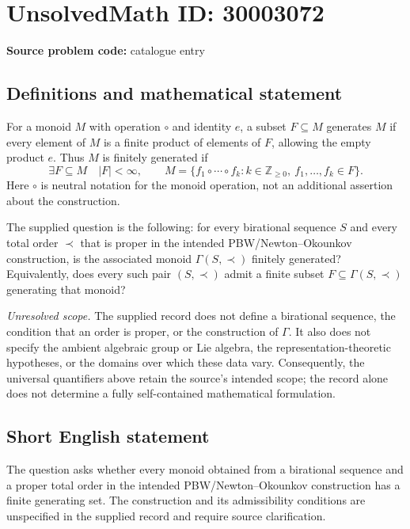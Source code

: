 \documentclass[11pt]{article}
\newcommand{\Z}{\mathbb{Z}}
\begin{document}
\section*{UnsolvedMath ID: 30003072}
\textbf{Source problem code:} catalogue entry
\subsection{Definitions and mathematical statement}
For a monoid \(M\) with operation \(\circ\) and identity \(e\), a subset \(F\subseteq M\) generates \(M\) if every element of \(M\) is a finite product of elements of \(F\), allowing the empty product \(e\). Thus \(M\) is finitely generated if
\[
\exists F\subseteq M\quad |F|<\infty,\qquad
M=\bigl\{f_1\circ\cdots\circ f_k : k\in\Z_{\geq 0},\ f_1,\ldots,f_k\in F\bigr\}.
\]
Here \(\circ\) is neutral notation for the monoid operation, not an additional assertion about the construction.

The supplied question is the following: for every birational sequence \(S\) and every total order \(\prec\) that is proper in the intended PBW/Newton--Okounkov construction, is the associated monoid \(\Gamma(S,\prec)\) finitely generated? Equivalently, does every such pair \((S,\prec)\) admit a finite subset \(F\subseteq\Gamma(S,\prec)\) generating that monoid?

\emph{Unresolved scope.} The supplied record does not define a birational sequence, the condition that an order is proper, or the construction of \(\Gamma\). It also does not specify the ambient algebraic group or Lie algebra, the representation-theoretic hypotheses, or the domains over which these data vary. Consequently, the universal quantifiers above retain the source's intended scope; the record alone does not determine a fully self-contained mathematical formulation.
\subsection{Short English statement}
The question asks whether every monoid obtained from a birational sequence and a proper total order in the intended PBW/Newton--Okounkov construction has a finite generating set. The construction and its admissibility conditions are unspecified in the supplied record and require source clarification.
\end{document}
